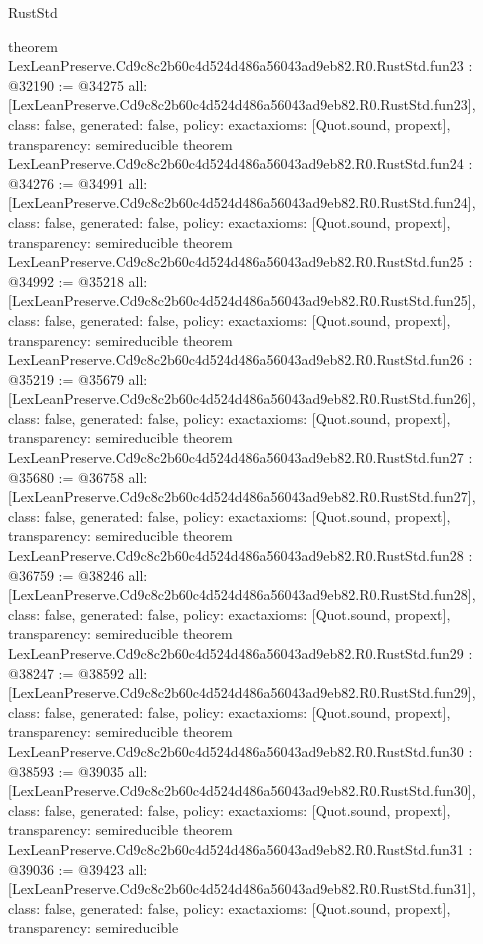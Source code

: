 \begin{lexlean}{RustStd}
\begin{coremodule}
{}
theorem LexLeanPreserve.Cd9c8c2b60c4d524d486a56043ad9eb82.R0.RustStd.fun23 : @32190 := @34275 {
  all: [LexLeanPreserve.Cd9c8c2b60c4d524d486a56043ad9eb82.R0.RustStd.fun23],
  class: false,
  generated: false,
  policy: exact{axioms: [Quot.sound, propext]},
  transparency: semireducible
}
theorem LexLeanPreserve.Cd9c8c2b60c4d524d486a56043ad9eb82.R0.RustStd.fun24 : @34276 := @34991 {
  all: [LexLeanPreserve.Cd9c8c2b60c4d524d486a56043ad9eb82.R0.RustStd.fun24],
  class: false,
  generated: false,
  policy: exact{axioms: [Quot.sound, propext]},
  transparency: semireducible
}
theorem LexLeanPreserve.Cd9c8c2b60c4d524d486a56043ad9eb82.R0.RustStd.fun25 : @34992 := @35218 {
  all: [LexLeanPreserve.Cd9c8c2b60c4d524d486a56043ad9eb82.R0.RustStd.fun25],
  class: false,
  generated: false,
  policy: exact{axioms: [Quot.sound, propext]},
  transparency: semireducible
}
theorem LexLeanPreserve.Cd9c8c2b60c4d524d486a56043ad9eb82.R0.RustStd.fun26 : @35219 := @35679 {
  all: [LexLeanPreserve.Cd9c8c2b60c4d524d486a56043ad9eb82.R0.RustStd.fun26],
  class: false,
  generated: false,
  policy: exact{axioms: [Quot.sound, propext]},
  transparency: semireducible
}
theorem LexLeanPreserve.Cd9c8c2b60c4d524d486a56043ad9eb82.R0.RustStd.fun27 : @35680 := @36758 {
  all: [LexLeanPreserve.Cd9c8c2b60c4d524d486a56043ad9eb82.R0.RustStd.fun27],
  class: false,
  generated: false,
  policy: exact{axioms: [Quot.sound, propext]},
  transparency: semireducible
}
theorem LexLeanPreserve.Cd9c8c2b60c4d524d486a56043ad9eb82.R0.RustStd.fun28 : @36759 := @38246 {
  all: [LexLeanPreserve.Cd9c8c2b60c4d524d486a56043ad9eb82.R0.RustStd.fun28],
  class: false,
  generated: false,
  policy: exact{axioms: [Quot.sound, propext]},
  transparency: semireducible
}
theorem LexLeanPreserve.Cd9c8c2b60c4d524d486a56043ad9eb82.R0.RustStd.fun29 : @38247 := @38592 {
  all: [LexLeanPreserve.Cd9c8c2b60c4d524d486a56043ad9eb82.R0.RustStd.fun29],
  class: false,
  generated: false,
  policy: exact{axioms: [Quot.sound, propext]},
  transparency: semireducible
}
theorem LexLeanPreserve.Cd9c8c2b60c4d524d486a56043ad9eb82.R0.RustStd.fun30 : @38593 := @39035 {
  all: [LexLeanPreserve.Cd9c8c2b60c4d524d486a56043ad9eb82.R0.RustStd.fun30],
  class: false,
  generated: false,
  policy: exact{axioms: [Quot.sound, propext]},
  transparency: semireducible
}
theorem LexLeanPreserve.Cd9c8c2b60c4d524d486a56043ad9eb82.R0.RustStd.fun31 : @39036 := @39423 {
  all: [LexLeanPreserve.Cd9c8c2b60c4d524d486a56043ad9eb82.R0.RustStd.fun31],
  class: false,
  generated: false,
  policy: exact{axioms: [Quot.sound, propext]},
  transparency: semireducible
}
\end{coremodule}
\end{lexlean}
